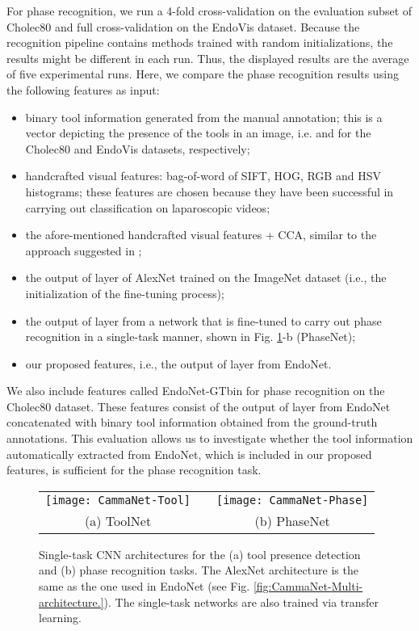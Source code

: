 \documentclass[journal]{IEEEtran} \usepackage{amssymb}
\begin{document}
For phase recognition, we run a 4-fold cross-validation on  the evaluation subset of Cholec80
and full cross-validation on the EndoVis dataset. Because the 
recognition pipeline contains methods trained with random initializations, the results might be 
different in each run. Thus, the displayed results are
the average of five experimental runs. Here, we compare the phase recognition results using the following features as input:
\begin{itemize}
\item binary tool information generated from the manual annotation; this is a vector
depicting the presence of the tools in an image, i.e.  and  for the Cholec80 and EndoVis datasets, respectively;
\item handcrafted visual features: bag-of-word of SIFT,
HOG, RGB and HSV histograms; these features are chosen because they have been successful in carrying out classification \cite{twinanda_ipcai2014} on laparoscopic videos;
\item the afore-mentioned handcrafted visual features + CCA, similar to the approach suggested in \cite{blum_miccai2010};
\item the output of layer  of AlexNet trained on the ImageNet
dataset (i.e., the initialization of the fine-tuning process);
\item the output of layer  from a network that is fine-tuned
to carry out phase recognition in a single-task manner, shown
in Fig. \ref{fig:Single-task-CNN-architectures}-b (PhaseNet);
\item our proposed features, i.e., the output of layer  from EndoNet.
\end{itemize}
We also include features called  EndoNet-GTbin for phase recognition on the Cholec80 dataset. 
These features consist of the output of layer  from EndoNet 
concatenated with binary tool information obtained from the ground-truth annotations.
This evaluation allows us to investigate whether the tool information automatically extracted from EndoNet, which is included in our proposed features, is sufficient for the phase recognition task.

\begin{figure}
\begin{centering}
\begin{tabular}{ccc}
\texttt{[image: CammaNet-Tool]} &  & \texttt{[image: CammaNet-Phase]}\tabularnewline
{\scriptsize (a) ToolNet} &  & {\scriptsize (b) PhaseNet}\tabularnewline
\end{tabular}
\par\end{centering}

\caption{Single-task CNN architectures for the (a) tool presence detection 
and (b) phase recognition tasks. The AlexNet architecture is the same
as the one used in EndoNet (see Fig. \ref{fig:CammaNet-Multi-architecture.}). The single-task networks are also trained via transfer learning.
\label{fig:Single-task-CNN-architectures}}
\end{figure}
\end{document}
